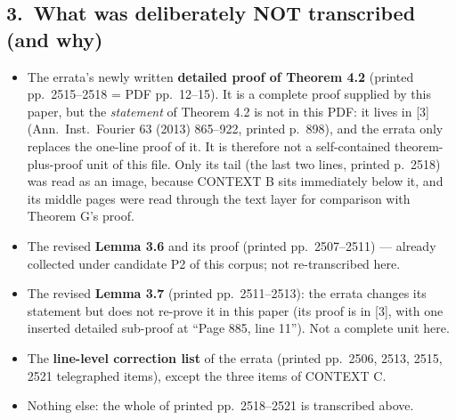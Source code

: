 \documentclass[11pt]{article}
\begin{document}
\subsection*{3.\ What was deliberately NOT transcribed (and why)}
\begin{itemize}\itemsep0.2em
\item The errata's newly written \textbf{detailed proof of Theorem 4.2} (printed
      pp.\ 2515--2518 = PDF pp.\ 12--15). It is a complete proof supplied by this paper,
      but the \emph{statement} of Theorem 4.2 is not in this PDF: it lives in [3]
      (Ann.\ Inst.\ Fourier 63 (2013) 865--922, printed p.\ 898), and the errata only
      replaces the one-line proof of it. It is therefore not a self-contained
      theorem-plus-proof unit of this file. Only its tail (the last two lines, printed
      p.\ 2518) was read as an image, because CONTEXT B sits immediately below it, and its
      middle pages were read through the text layer for comparison with Theorem G's proof.
\item The revised \textbf{Lemma 3.6} and its proof (printed pp.\ 2507--2511) --- already
      collected under candidate P2 of this corpus; not re-transcribed here.
\item The revised \textbf{Lemma 3.7} (printed pp.\ 2511--2513): the errata changes its
      statement but does not re-prove it in this paper (its proof is in [3], with one
      inserted detailed sub-proof at ``Page 885, line 11''). Not a complete unit here.
\item The \textbf{line-level correction list} of the errata (printed pp.\ 2506, 2513,
      2515, 2521 telegraphed items), except the three items of CONTEXT C.
\item Nothing else: the whole of printed pp.\ 2518--2521 is transcribed above.
\end{itemize}
\end{document}
